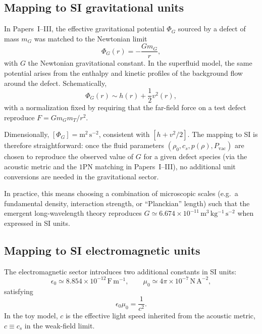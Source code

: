 \documentclass[11pt]{article}
\begin{document}
\subsection{Mapping to SI gravitational units}

In Papers~I--III, the effective gravitational potential $\Phi_G$ sourced by a defect of mass $m_G$ was matched to the Newtonian limit
\begin{equation}
\Phi_G(r) = -\frac{G m_G}{r},
\end{equation}
with $G$ the Newtonian gravitational constant.  In the superfluid model, the same potential arises from the enthalpy and kinetic profiles of the background flow around the defect.  Schematically,
\begin{equation}
\Phi_G(r) \sim h(r) + \frac{1}{2}v^2(r),
\end{equation}
with a normalization fixed by requiring that the far-field force on a test defect reproduce $F = G m_G m_T / r^2$.

Dimensionally, $[\Phi_G] = \mathrm{m^2\,s^{-2}}$, consistent with $[h + v^2/2]$.  The mapping to SI is therefore straightforward: once the fluid parameters $(\rho_0,c_s,p(\rho),P_{\mathrm{vac}})$ are chosen to reproduce the observed value of $G$ for a given defect species (via the acoustic metric and the $1$PN matching in Papers~I--III), no additional unit conversions are needed in the gravitational sector.

In practice, this means choosing a combination of microscopic scales (e.g.\ a fundamental density, interaction strength, or ``Planckian'' length) such that the emergent long-wavelength theory reproduces $G \simeq 6.674\times 10^{-11}\,\mathrm{m^3\,kg^{-1}\,s^{-2}}$ when expressed in SI units.

\subsection{Mapping to SI electromagnetic units}

The electromagnetic sector introduces two additional constants in SI units:
\begin{equation}
\epsilon_0 \simeq 8.854\times 10^{-12}\,\mathrm{F\,m^{-1}},
\qquad
\mu_0 \simeq 4\pi\times 10^{-7}\,\mathrm{N\,A^{-2}},
\end{equation}
satisfying
\begin{equation}
\epsilon_0 \mu_0 = \frac{1}{c^2}.
\end{equation}
In the toy model, $c$ is the effective light speed inherited from the acoustic metric, $c \equiv c_s$ in the weak-field limit.
\end{document}

